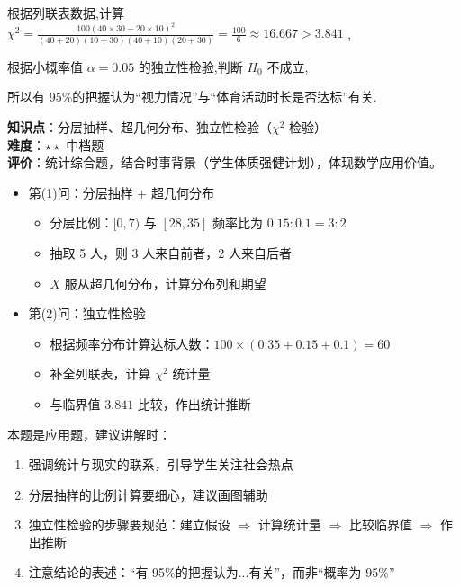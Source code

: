 \documentclass[10pt]{article}
\begin{document}
根据列联表数据,计算 \({\chi }^{2} = \frac{{100}{\left( {40} \times  {30} - {20} \times  {10}\right) }^{2}}{\left( {{40} + {20}}\right) \left( {{10} + {30}}\right) \left( {{40} + {10}}\right) \left( {{20} + {30}}\right) } = \frac{100}{6} \approx  {16.667} > {3.841}\) ,

根据小概率值 \(\alpha  = {0.05}\) 的独立性检验,判断 \({H}_{0}\) 不成立,

所以有 95\%的把握认为``视力情况''与``体育活动时长是否达标''有关.

\begin{analysisbox}[考点分析]
\textbf{知识点}：分层抽样、超几何分布、独立性检验（\(\chi^2\) 检验）\\
\textbf{难度}：\(\star\star\) 中档题\\
\textbf{评价}：统计综合题，结合时事背景（学生体质强健计划），体现数学应用价值。
\begin{itemize}
\item 第(1)问：分层抽样 + 超几何分布
  \begin{itemize}
  \item 分层比例：\([0,7)\) 与 \([28,35]\) 频率比为 \(0.15:0.1 = 3:2\)
  \item 抽取 5 人，则 3 人来自前者，2 人来自后者
  \item \(X\) 服从超几何分布，计算分布列和期望
  \end{itemize}
\item 第(2)问：独立性检验
  \begin{itemize}
  \item 根据频率分布计算达标人数：\(100 \times (0.35+0.15+0.1) = 60\)
  \item 补全列联表，计算 \(\chi^2\) 统计量
  \item 与临界值 \(3.841\) 比较，作出统计推断
  \end{itemize}
\end{itemize}
\end{analysisbox}

\begin{tipbox}[教学提示]
本题是应用题，建议讲解时：
\begin{enumerate}
\item 强调统计与现实的联系，引导学生关注社会热点
\item 分层抽样的比例计算要细心，建议画图辅助
\item 独立性检验的步骤要规范：建立假设 $\Rightarrow$ 计算统计量 $\Rightarrow$ 比较临界值 $\Rightarrow$ 作出推断
\item 注意结论的表述：``有 95\%的把握认为...有关''，而非``概率为 95\%''
\end{enumerate}
\end{tipbox}
\end{document}

